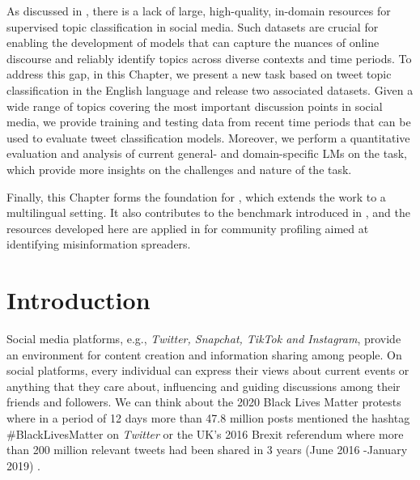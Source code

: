 As discussed in , there is a lack of large, high-quality, in-domain resources for supervised topic classification in social media. Such datasets are crucial for enabling the development of models that can capture the nuances of online discourse and reliably identify topics across diverse contexts and time periods. To address this gap, in this Chapter, we present a new task based on tweet topic classification in the English language and release two associated datasets. Given a wide range of topics covering the most important discussion points in social media, we provide training and testing data from recent time periods that can be used to evaluate tweet classification models. Moreover, we perform a quantitative evaluation and analysis of current general- and domain-specific \acp{LM} on the task, which provide more insights on the challenges and nature of the task. 

Finally, this Chapter forms the foundation for  , which extends the work to a multilingual setting. It also contributes to the {\DATASET} benchmark introduced in , and the resources developed here are applied in  for community profiling aimed at identifying misinformation spreaders.


\section{Introduction}

Social media platforms, e.g., \textit{Twitter, Snapchat, TikTok and Instagram}, provide an environment for content creation and information sharing among people. On social platforms, every individual can express their views about current events or anything that they care about, influencing and guiding discussions among their friends and followers.  We can think about the 2020 Black Lives Matter protests where in a period of 12 days more than 47.8 million posts mentioned the hashtag \#BlackLivesMatter on \textit{Twitter} \cite{anderson2020blacklivesmatter} or the UK's 2016 Brexit referendum where more than 200 million relevant tweets had been shared in 3 years (June 2016 -January 2019) \cite{thenationalThisMany}.

